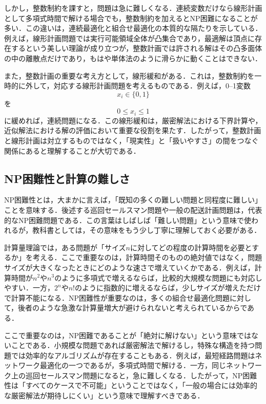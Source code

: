 しかし，整数制約を課すと，問題は急に難しくなる．連続変数だけなら線形計画として多項式時間で解ける場合でも，整数制約を加えるとNP困難になることが多い．この違いは，連続最適化と組合せ最適化の本質的な隔たりを示している．例えば，線形計画問題では実行可能領域全体が凸集合であり，最適解は頂点に存在するという美しい理論が成り立つが，整数計画では許される解はその凸多面体の中の離散点だけであり，もはや単体法のように滑らかに動くことはできない．

また，整数計画の重要な考え方として，線形緩和がある．これは，整数制約を一時的に外して，対応する線形計画問題を考えるものである．例えば，0--1変数
\begin{equation}
x_i\in \{0,1\}
\end{equation}
を
\begin{equation}
0\le x_i\le 1
\end{equation}
に緩めれば，連続問題になる．この線形緩和は，厳密解法における下界計算や，近似解法における解の評価において重要な役割を果たす．したがって，整数計画と線形計画は対立するものではなく，「現実性」と「扱いやすさ」の間をつなぐ関係にあると理解することが大切である．

\subsection{NP困難性と計算の難しさ}

NP困難性とは，大まかに言えば，「既知の多くの難しい問題と同程度に難しい」ことを意味する．後述する巡回セールスマン問題や一般の配送計画問題は，代表的なNP困難問題である．この言葉はしばしば「難しい問題」という意味で使われるが，教科書としては，その意味をもう少し丁寧に理解しておく必要がある．

計算量理論では，ある問題が「サイズ$n$に対してどの程度の計算時間を必要とするか」を考える．ここで重要なのは，計算時間そのものの絶対値ではなく，問題サイズが大きくなったときにどのような速さで増えていくかである．例えば，計算時間が$n^2$や$n^3$のように多項式で増えるならば，比較的大規模な問題にも対応しやすい．一方，$2^n$や$n!$のように指数的に増えるならば，少しサイズが増えただけで計算不能になる．NP困難性が重要なのは，多くの組合せ最適化問題に対して，後者のような急激な計算量増大が避けられないと考えられているからである．

ここで重要なのは，NP困難であることが「絶対に解けない」という意味ではないことである．小規模な問題であれば厳密解法で解けるし，特殊な構造を持つ問題では効率的なアルゴリズムが存在することもある．例えば，最短経路問題はネットワーク最適化の一つであるが，多項式時間で解ける．一方，同じネットワーク上の巡回セールスマン問題になると，急に難しくなる．したがって，NP困難性は「すべてのケースで不可能」ということではなく，「一般の場合には効率的な厳密解法が期待しにくい」という意味で理解すべきである．

